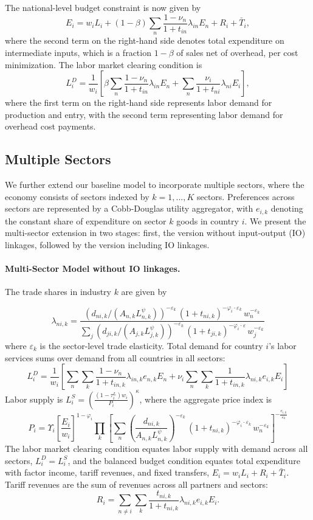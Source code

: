 \documentclass[12pt]{article}
\begin{document}
 The national-level budget constraint is now given by
 \[
 E_{i}=w_{i}L_{i}+\left(1-\beta \right)\sum_{n}\frac{1-\nu_{n}}{1+t_{in}}\lambda_{in}E_{n}+R_{i}+\bar{T}_i,
 \]
 where the second term on the right-hand side denotes total expenditure on intermediate inputs, which is a fraction $1-\beta$ of sales net of overhead, per cost minimization. The labor market clearing condition is
 \[
 L_{i}^{D}=\frac{1}{w_{i}}\left[\beta\sum_{n}\frac{1-\nu_{n}}{1+t_{in}}\lambda_{in}E_{n}+\sum_{n}\frac{\nu_{i}}{1+t_{ni}}\lambda_{ni}E_{i}\right],
 \]
 where the first term on the right-hand side represents labor demand for production and entry, with the second term representing labor demand for overhead cost payments.


\subsection{ Multiple Sectors}
\label{app:multisectors}
We further extend our baseline model to incorporate multiple sectors, where the economy consists of sectors indexed by $k=1,...,K$ sectors. Preferences  across sectors are represented by a Cobb-Douglas utility aggregator, with $e_{i,k}$ denoting the constant share of expenditure on sector $k$ goods in country $i$. We present the multi-sector extension in two stages: first, the version without input-output (IO) linkages, followed by the version including IO linkages. 
\paragraph{Multi-Sector Model without IO linkages.}
The trade shares in industry $k$ are given by

\[
\lambda_{ni,k}=\frac{\left(d_{ni,k}/(A_{n,k}L_{n,k}^{\psi})\right)^{-\varepsilon_{k}}\,(1+t_{ni,k})^{-\varphi_{i}\cdot\varepsilon_{k}}\,w_{n}^{-\varepsilon_{k}}}{\sum_{j}\left(d_{ji,k}/(A_{j,k}L_{j,k}^{\psi})\right)^{-\varepsilon_{k}}\,(1+t_{ji,k})^{-\varphi_{i}\cdot\varepsilon}\,w_{j}^{-\varepsilon_{k}}}
\]
where $\varepsilon_k$ is the sector-level trade elasticity. Total demand for country $i$'s labor services sums over demand from all countries in all sectors:
\[
L_{i}^{D}=\frac{1}{w_{i}}\left[\sum_{n}\sum_{k}\frac{1-\nu_{n}}{1+t_{in,k}}\lambda_{in,k}e_{n,k}E_{n}+\nu_{i}\sum_{n}\sum_{k}\frac{1}{1+t_{in,k}}\lambda_{ni,k}e_{i,k}E_{i}\right]
\]
Labor supply is $L_{i}^{S}=\left(\frac{(1-\tau_{i}^L)w_{i}}{P_{i}}\right)^{\kappa}$, where the aggregate price index is 
\[
P_{i}=\Upsilon_{i}\left[\frac{E_{i}}{w_{i}}\right]^{1-\varphi_{i}}\prod_{k}\left[\sum_{n}\left(\frac{d_{ni,k}}{A_{n,k}L_{n,k}^{\psi}}\right)^{-\varepsilon_k}\,(1+t_{ni,k})^{-\varphi_{i}\cdot\varepsilon_{k}}\,w_{n}^{-\varepsilon_{k}}\right]^{-\frac{e_{i,k}}{\varepsilon_{k}}}
\]
The labor market clearing condition equates labor supply with demand across all sectors, $L_{i}^{D}=L_{i}^{S}$, and the balanced budget condition equates total expenditure with factor income, tariff revenues, and fixed transfers, $E_{i}=w_{i}L_{i}+R_{i}+\bar{T}_{i}$. Tariff revenues are the sum of revenues across all partners and sectors:
\[
R_{i}=\sum_{n\neq i}\sum_{k}\frac{t_{ni,k}}{1+t_{ni,k}}\lambda_{ni,k}e_{i,k}E_{i}.
\]
\end{document}
